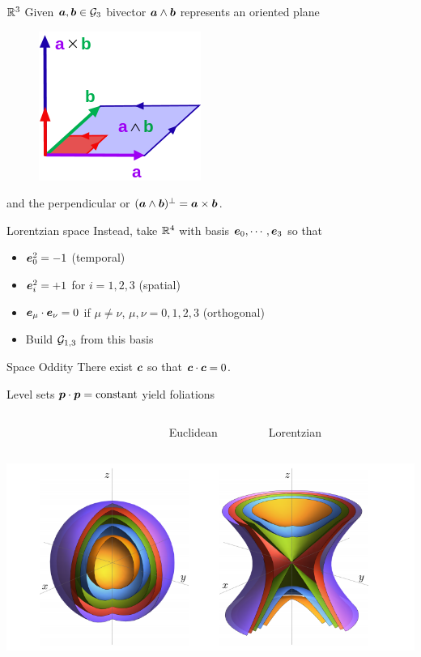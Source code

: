 \documentclass[aspectratio=169]{beamer}
\begin{document}
\begin{frame}{$\mathbb{R}^3$}
\vfill
Given $\boldsymbol{a},\boldsymbol{b}\in \mathcal{G}_3$ bivector $\boldsymbol{a}\wedge \boldsymbol{b}$ represents an oriented plane
	\begin{figure}[H]
		\includegraphics[width=.3\textwidth]{figures/bivector.png}
	\end{figure}
and the perpendicular or  $(\boldsymbol{a}\wedge \boldsymbol{b})^\perp = \boldsymbol{a}\times \boldsymbol{b}$.
\vfill
\end{frame}

\begin{frame}{Lorentzian space}
\vfill
Instead, take $\mathbb{R}^4$ with basis $\boldsymbol{e}_0,\cdots,\boldsymbol{e}_3$ so that
\begin{itemize}
	\item $\boldsymbol{e}_0^2 = -1$ (temporal)
	\item $\boldsymbol{e}_i^2 = +1$ for $i=1,2,3$ (spatial)
	\item $\boldsymbol{e}_\mu \cdot \boldsymbol{e}_\nu = 0$ if $\mu \neq \nu$, $\mu,\nu = 0,1,2,3$  (orthogonal)
	\item Build $\mathcal{G}_{1,3}$ from this basis
\end{itemize}
\vfill
\end{frame}

\begin{frame}{Space Oddity}
\vfill
\center
There exist  $\boldsymbol{c}$ so that $\boldsymbol{c}\cdot \boldsymbol{c} = 0$.
\vfill
\end{frame}

\begin{frame}{}
\vfill
\centering Level sets $\boldsymbol{p}\cdot \boldsymbol{p} = \textrm{constant}$ yield foliations
\vspace*{.5cm}
\begin{columns}[c]
~~~~~~~~~~~~~~~~~~~~~~~~~~~~ Euclidean 

~~~~~~Lorentzian
\end{columns}
\begin{center}
    \includegraphics[scale=.5]{figures/foliations2.png}
\end{center}
\vfill   
\end{frame}
\end{document}
